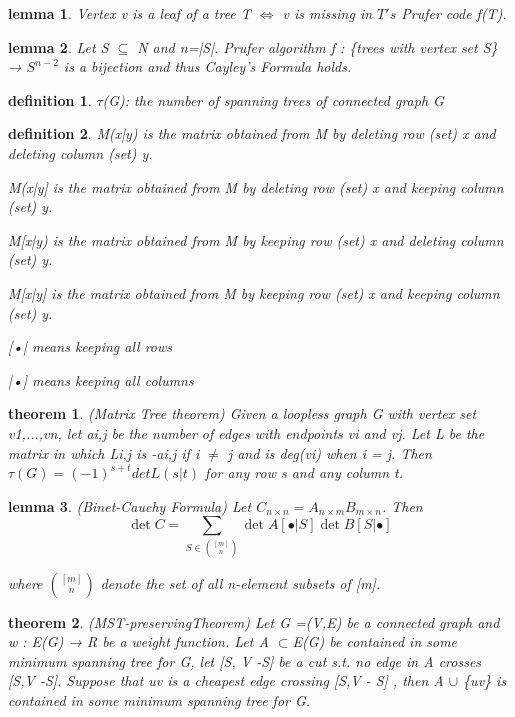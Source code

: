 \documentclass[twocolumn]{article}
\newtheorem{theorem}{theorem}[section]  %
\newtheorem{definition}{definition}
\newtheorem{lemma}{lemma}
\begin{document}
\begin{CJK*}{UTF8}{bkai}
    \begin{lemma}
        Vertex v is a leaf of a tree T $\iff$ v is missing in $T's$ Prufer code f(T).
    \end{lemma}

    \begin{lemma}
        Let S $\subseteq$ N and n=|S|. Prufer algorithm f : \{trees with vertex set S\} → $S^{n-2}$
 is a bijection and thus Cayley's Formula holds.
    \end{lemma}    

    \begin{definition}
         $\tau$(G): the number of spanning trees of connected graph G
    \end{definition}

    \begin{definition}
        M(x|y) is the matrix obtained from M by deleting row (set) x and deleting
 column (set) y.

 M(x|y] is the matrix obtained from M by deleting row (set) x and keeping
 column (set) y.

 M[x|y) is the matrix obtained from M by keeping row (set) x and deleting
 column (set) y.

 M[x|y] is the matrix obtained from M by keeping row (set) x and keeping
 column (set) y.

 [•| means keeping all rows
 
 |•] means keeping all columns
    \end{definition}


    \begin{theorem}{(Matrix Tree theorem)}
        Given a loopless graph G with vertex set v1,...,vn, let ai,j be the number of
 edges with endpoints vi and vj. Let L be the matrix in which Li,j is -ai,j if
 i $\neq$ j and is deg(vi) when i = j. Then
 $\tau(G) = (-1)^{s+t}detL(s|t)$
 for any row s and any column t.
    \end{theorem}

    \begin{lemma}{(Binet-Cauchy Formula)}
        Let \( C_{n \times n} = A_{n \times m} B_{m \times n} \). Then
        \[
        \det C = \sum_{S \in \binom{[m]}{n}} \det A[\bullet |S] \det B[S| \bullet]
        \]

        where $\binom{[m]}{n}$ denote the set of all n-element subsets of [m].
    \end{lemma}

    \begin{theorem}{(MST-preservingTheorem)}
        Let G =(V,E) be a connected graph and w : E(G) → R be a weight function.
 Let A $\subset$E(G) be contained in some minimum spanning tree for G, let
 [S, V -S] be a cut s.t. no edge in A crosses [S,V -S]. Suppose that uv is a
 cheapest edge crossing [S,V - S] , then A $\cup$ \{uv\} is contained in some
 minimum spanning tree for G.
    \end{theorem}


\end{CJK*}
\end{document}

